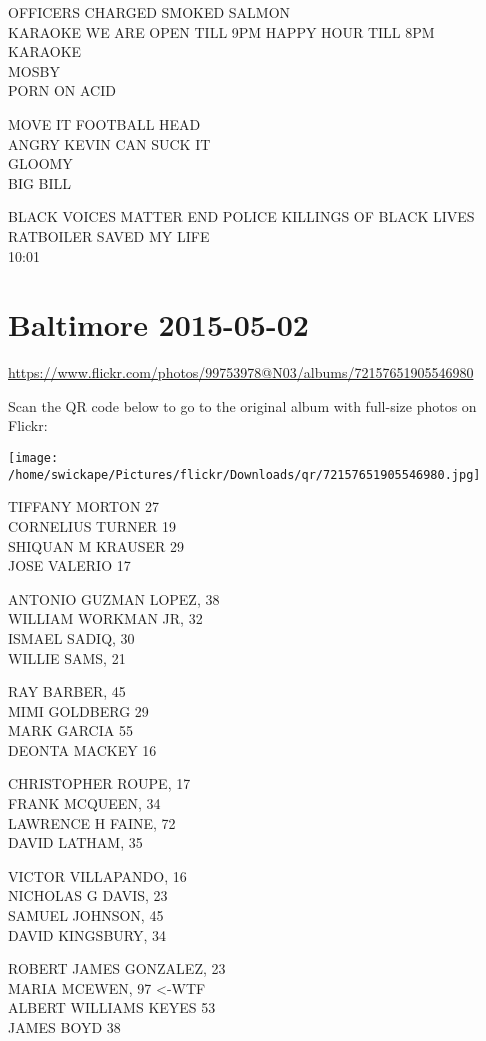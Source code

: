 \documentclass[10pt,letterpaper]{article}
\begin{document}
OFFICERS CHARGED SMOKED SALMON\\
KARAOKE WE ARE OPEN TILL 9PM HAPPY HOUR TILL 8PM KARAOKE\\
MOSBY\\
PORN ON ACID

MOVE IT FOOTBALL HEAD\\
ANGRY KEVIN CAN SUCK IT\\
GLOOMY\\
BIG BILL

BLACK VOICES MATTER END POLICE KILLINGS OF BLACK LIVES\\
RATBOILER SAVED MY LIFE\\
10:01


\section*{Baltimore 2015-05-02}

\url{https://www.flickr.com/photos/99753978@N03/albums/72157651905546980}

Scan the QR code below to go to the original album with full-size photos on Flickr:

\texttt{[image: /home/swickape/Pictures/flickr/Downloads/qr/72157651905546980.jpg]}


TIFFANY MORTON 27\\
CORNELIUS TURNER 19\\
SHIQUAN M KRAUSER 29\\
JOSE VALERIO 17

ANTONIO GUZMAN LOPEZ, 38\\
WILLIAM WORKMAN JR, 32\\
ISMAEL SADIQ, 30\\
WILLIE SAMS, 21

RAY BARBER, 45\\
MIMI GOLDBERG 29\\
MARK GARCIA 55\\
DEONTA MACKEY 16

CHRISTOPHER ROUPE, 17\\
FRANK MCQUEEN, 34\\
LAWRENCE H FAINE, 72\\
DAVID LATHAM, 35

VICTOR VILLAPANDO, 16\\
NICHOLAS G DAVIS, 23\\
SAMUEL JOHNSON, 45\\
DAVID KINGSBURY, 34

ROBERT JAMES GONZALEZ, 23\\
MARIA MCEWEN, 97 <{-}WTF\\
ALBERT WILLIAMS KEYES 53\\
JAMES BOYD 38
\end{document}
